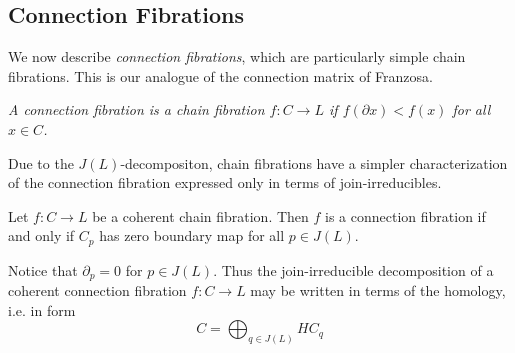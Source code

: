 \subsection{Connection Fibrations}

We now describe {\em connection fibrations}, which are particularly simple chain fibrations. This is our analogue of the connection matrix of Franzosa.

\begin{defn}\label{def:connection}
{\em
A {\em connection fibration} is a chain fibration $f:C\to L$ if $f(\partial x) < f(x)$ for all $x\in C$.
}
\end{defn}



Due to the $J(L)$-decompositon, chain fibrations have a simpler characterization of the connection fibration expressed only in terms of join-irreducibles. 


\begin{prop}
Let $f:C\to L$ be a coherent chain fibration.  Then $f$ is a connection fibration if and only if $C_p$ has zero boundary map for all $p\in J(L)$.
\end{prop}



\begin{rem}
Notice that $\partial_p = 0$ for  $p\in J(L)$.  Thus the join-irreducible decomposition of a coherent connection fibration $f:C\to L$ may be written in terms of the homology, i.e. in form $$C=\bigoplus_{q\in J(L)} HC_q$$
\end{rem}


%
%
%



